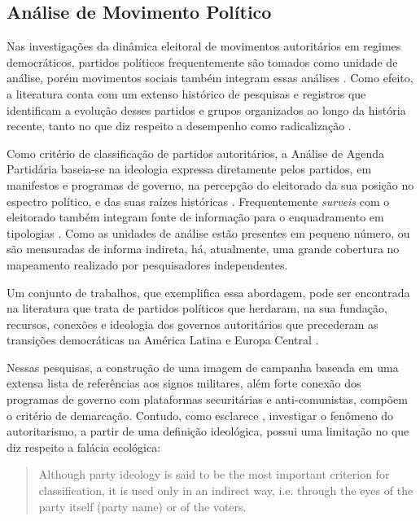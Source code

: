 \documentclass[
12pt,				%
openright,			%
twoside,			%
a4paper,			%
english,			%
french,				%
spanish,			%
brazil				%
]{abntex2}
\begin{document}
\subsection{Análise de Movimento Político}

Nas investigações da dinâmica eleitoral de movimentos autoritários em regimes democráticos, partidos políticos frequentemente são tomados como unidade de análise, porém movimentos sociais também integram essas análises \cite{caiani2017radical}. Como efeito, a literatura conta com um extenso histórico de pesquisas e registros que identificam a evolução desses partidos e grupos organizados ao longo da história recente, tanto no que diz respeito a desempenho como radicalização \cite{norris2005radical, mudde2009populist, caiani2017radical, mudde2016introduction, mudde2017ideational}. 

Como critério de classificação de partidos autoritários, a Análise de Agenda Partidária baseia-se na ideologia expressa diretamente pelos partidos, em manifestos e programas de governo, na percepção do eleitorado da sua posição no espectro político, e das suas raízes históricas \cite{mudde2000ideology}. Frequentemente \emph{surveis} com o eleitorado também integram fonte de informação para o enquadramento em tipologias \cite{booth1984political, booth1994paths, macwilliams2016decides}. Como as unidades de análise estão presentes em pequeno número, ou são mensuradas de informa indireta, há, atualmente, uma grande cobertura no mapeamento realizado por pesquisadores independentes.

Um conjunto de trabalhos, que exemplifica essa abordagem, pode ser encontrada na literatura que trata de partidos políticos que herdaram, na sua fundação, recursos, conexões e ideologia dos governos autoritários que precederam as transições democráticas na América Latina \cite{loxton2015authoritarian, loxton2014authoritarian, lyons2016victorious, loxton2015authoritarian} e Europa Central \cite{grzymala2006authoritarian}. 

Nessas pesquisas, a construção de uma imagem de campanha baseada em uma extensa lista de referências aos signos militares, além forte conexão dos programas de governo com plataformas securitárias e anti-comunistas, compõem o critério de demarcação. Contudo, como esclarece , investigar o fenômeno do autoritarismo, a partir de uma definição ideológica, possui uma limitação no que diz respeito a falácia ecológica:

\begin{samepage}
	\begin{quote}
		Although party ideology is said to be the most important criterion for classification, it is used only in an indirect way, i.e. through the eyes of the party itself (party name) or of the voters. \cite{mudde2000ideology}
	\end{quote}
\end{samepage}
\end{document}
